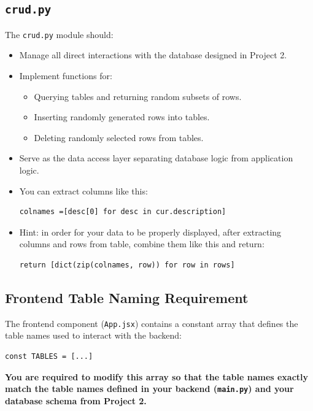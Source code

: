 \documentclass{article}
\begin{document}
\subsection*{\texttt{crud.py}}

The \texttt{crud.py} module should:

\begin{itemize}
    \item Manage all direct interactions with the database designed in Project 2.
    \item Implement functions for:
    \begin{itemize}
        \item Querying tables and returning random subsets of rows.
        \item Inserting randomly generated rows into tables.
        \item Deleting randomly selected rows from tables.
    \end{itemize}
    \item Serve as the data access layer separating database logic from application logic.
    \item You can extract columns like this:  \begin{verbatim}colnames =[desc[0] for desc in cur.description]\end{verbatim}
    \item Hint: in order for your data to be properly displayed, after extracting columns and rows from table, combine them like this and return:\begin{verbatim}return [dict(zip(colnames, row)) for row in rows]\end{verbatim}
\end{itemize}

\subsection*{Frontend Table Naming Requirement}

The frontend component (\texttt{App.jsx}) contains a constant array that defines the table names used to interact with the backend:

\begin{verbatim}
const TABLES = [...]
\end{verbatim}

\textbf{You are required to modify this array so that the table names exactly match the table names defined in your backend (\texttt{main.py}) and your database schema from Project 2.}
\end{document}
